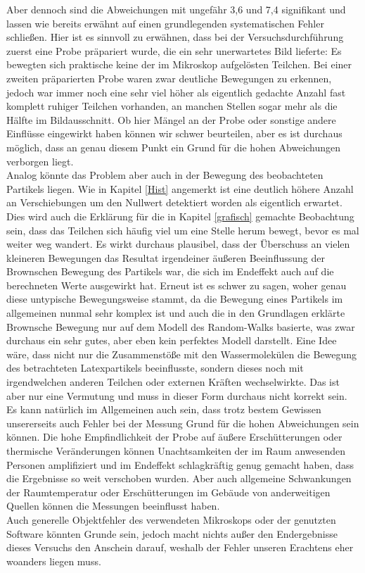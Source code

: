 \documentclass{article}
\begin{document}
Aber dennoch sind die Abweichungen mit ungefähr 3,6 und 7,4 signifikant und lassen wie bereits erwähnt auf einen grundlegenden systematischen Fehler schließen. Hier ist es sinnvoll zu erwähnen, dass bei der Versuchsdurchführung zuerst eine Probe präpariert wurde, die ein sehr unerwartetes Bild lieferte: Es bewegten sich praktische keine der im Mikroskop aufgelösten Teilchen. Bei einer zweiten präparierten Probe waren zwar deutliche Bewegungen zu erkennen, jedoch war immer noch eine sehr viel höher als eigentlich gedachte Anzahl fast komplett ruhiger Teilchen vorhanden, an manchen Stellen sogar mehr als die Hälfte im Bildausschnitt. Ob hier Mängel an der Probe oder sonstige andere Einflüsse eingewirkt haben können wir schwer beurteilen, aber es ist durchaus möglich, dass an genau diesem Punkt ein Grund für die hohen Abweichungen verborgen liegt. \\ Analog könnte das Problem aber auch in der Bewegung des beobachteten Partikels liegen. Wie in Kapitel \ref{Hist} angemerkt ist eine deutlich höhere Anzahl an Verschiebungen um den Nullwert detektiert worden als eigentlich erwartet. Dies wird auch die Erklärung für die in Kapitel \ref{grafisch} gemachte Beobachtung sein, dass das Teilchen sich häufig viel um eine Stelle herum bewegt, bevor es mal weiter weg wandert. Es wirkt durchaus plausibel, dass der Überschuss an vielen kleineren Bewegungen das Resultat irgendeiner äußeren Beeinflussung der Brownschen Bewegung des Partikels war, die sich im Endeffekt auch auf die berechneten Werte ausgewirkt hat. Erneut ist es schwer zu sagen, woher genau diese untypische Bewegungsweise stammt, da die Bewegung eines Partikels im allgemeinen nunmal sehr komplex ist und auch die in den Grundlagen erklärte Brownsche Bewegung nur auf dem Modell des Random-Walks basierte, was zwar durchaus ein sehr gutes, aber eben kein perfektes Modell darstellt. Eine Idee wäre, dass nicht nur die Zusammenstöße mit den Wassermolekülen die Bewegung des betrachteten Latexpartikels beeinflusste, sondern dieses noch mit irgendwelchen anderen Teilchen oder externen Kräften wechselwirkte. Das ist aber nur eine Vermutung und muss in dieser Form durchaus nicht korrekt sein. \\ Es kann natürlich im Allgemeinen auch sein, dass trotz bestem Gewissen unsererseits auch Fehler bei der Messung Grund für die hohen Abweichungen sein können. Die hohe Empfindlichkeit der Probe auf äußere Erschütterungen oder thermische Veränderungen können Unachtsamkeiten der im Raum anwesenden Personen amplifiziert und im Endeffekt schlagkräftig genug gemacht haben, dass die Ergebnisse so weit verschoben wurden. Aber auch allgemeine Schwankungen der Raumtemperatur oder Erschütterungen im Gebäude von anderweitigen Quellen können die Messungen beeinflusst haben. \\ Auch generelle Objektfehler des verwendeten Mikroskops oder der genutzten Software könnten Grunde sein, jedoch macht nichts außer den Endergebnisse dieses Versuchs den Anschein darauf, weshalb der Fehler unseren Erachtens eher woanders liegen muss.  
\end{document}

